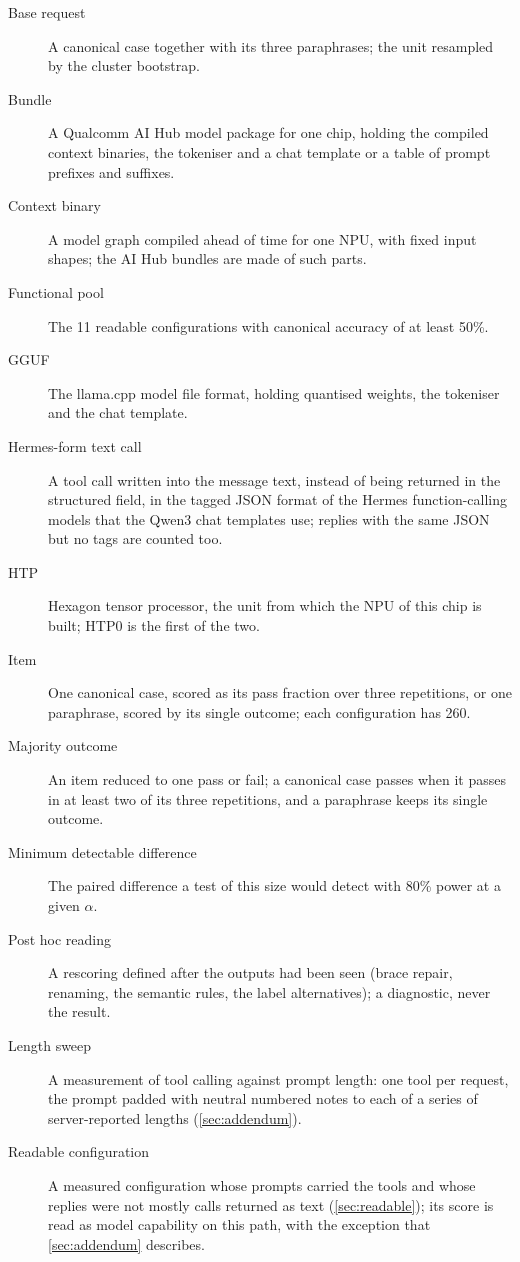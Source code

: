 \documentclass[11pt]{article}
\begin{document}
\begin{description}
\item[Base request] A canonical case together with its three paraphrases; the unit resampled by the cluster bootstrap.
\item[Bundle] A Qualcomm AI Hub model package for one chip, holding the compiled context binaries, the tokeniser and a chat template or a table of prompt prefixes and suffixes.
\item[Context binary] A model graph compiled ahead of time for one NPU, with fixed input shapes; the AI Hub bundles are made of such parts.
\item[Functional pool] The 11 readable configurations with canonical accuracy of at least 50\%.
\item[GGUF] The llama.cpp model file format, holding quantised weights, the tokeniser and the chat template.
\item[Hermes-form text call] A tool call written into the message text, instead of being returned in the structured field, in the tagged JSON format of the Hermes function-calling models that the Qwen3 chat templates use; replies with the same JSON but no tags are counted too.
\item[HTP] Hexagon tensor processor, the unit from which the NPU of this chip is built; HTP0 is the first of the two.
\item[Item] One canonical case, scored as its pass fraction over three repetitions, or one paraphrase, scored by its single outcome; each configuration has 260.
\item[Majority outcome] An item reduced to one pass or fail; a canonical case passes when it passes in at least two of its three repetitions, and a paraphrase keeps its single outcome.
\item[Minimum detectable difference] The paired difference a test of this size would detect with 80\% power at a given $\alpha$.
\item[Post hoc reading] A rescoring defined after the outputs had been seen (brace repair, renaming, the semantic rules, the label alternatives); a diagnostic, never the result.
\item[Length sweep] A measurement of tool calling against prompt length: one tool per request, the prompt padded with neutral numbered notes to each of a series of server-reported lengths (\cref{sec:addendum}).
\item[Readable configuration] A measured configuration whose prompts carried the tools and whose replies were not mostly calls returned as text (\cref{sec:readable}); its score is read as model capability on this path, with the exception that \cref{sec:addendum} describes.

\end{description}
\end{document}
